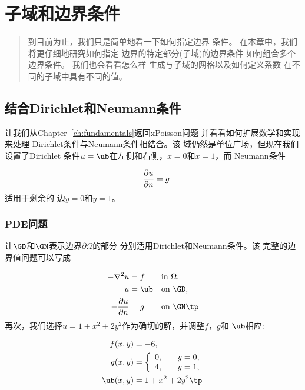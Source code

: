 \chapter{子域和边界条件}
\label{ch:subdomains}



\begin{quote}
到目前为止，我们只是简单地看一下如何指定边界
条件。 在本章中，我们将更仔细地研究如何指定
边界的特定部分(子域)的边界条件
如何组合多个边界条件。 我们也会看看怎么样
生成与子域的网格以及如何定义系数
在不同的子域中具有不同的值。
\end{quote}


\section{结合Dirichlet和Neumann条件}
\label{ch:poisson0:DN}

让我们从Chapter~\ref{ch:fundamentals}返回xPoisson问题
并看看如何扩展数学和实现来处理
Dirichlet条件与Neumann条件相结合。该
域仍然是单位广场，但现在我们设置了Dirichlet
条件$u=\ub$在左侧和右侧，$x=0$和$x=1$，而
Neumann条件

\begin{equation*}
-{\partial u\over\partial n}=g
\end{equation*}
适用于剩余的
边$y=0$和$y=1$。


\subsection{PDE问题}

让$\GD$和$\GN$表示边界$\partial\Omega$的部分
分别适用Dirichlet和Neumann条件。该
完整的边界值问题可以写成

\begin{alignat}{2}
    - \nabla^2 u &= f \quad&&\mbox{in } \Omega,  \\
    u &= \ub &&\mbox{on } \GD,       \\
    - {\partial u\over\partial n} &= g &&\mbox{on } \GN  \tp
\end{alignat}
再次，我们选择$u=1+x^2 + 2y^2$作为确切的解，并调整$f$，$g$和
$\ub$相应:

\begin{align*}
f(x, y) &= -6,\\
g(x, y) &= \left\lbrace\begin{array}{ll}
0, & \quad y=0,\\
4, & \quad y=1,
\end{array}\right.\\
\ub(x, y) &= 1 + x^2 + 2y^2\tp
\end{align*}

